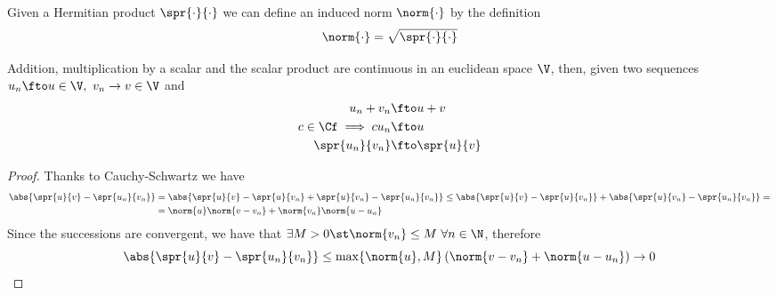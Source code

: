 \documentclass[../mmf.tex]{subfiles}
\begin{document}
\begin{thm}
	Given a Hermitian product $\spr{\cdot}{\cdot}$ we can define an induced norm $\norm{\cdot}$ by the definition
	\begin{equation}
		\norm{\cdot}=\sqrt{\spr{\cdot}{\cdot}}
		\label{eq:indnorm}
	\end{equation}
\end{thm}
\begin{thm}
	Addition, multiplication by a scalar and the scalar product are continuous in an euclidean space $\V$, then, given two sequences $u_n\fto u\in\V,\ v_n\to v\in\V$ and
	\begin{equation*}
		\begin{aligned}
			u_n+v_n&\fto u+v\\
			c\in\Cf\implies cu_n&\fto u\\
			\spr{u_n}{v_n}&\fto\spr{u}{v}
		\end{aligned}
	\end{equation*}
\end{thm}
\begin{proof}
	Thanks to Cauchy-Schwartz we have
	\begin{equation*}
		\begin{aligned}
			\abs{\spr{u}{v}-\spr{u_n}{v_n}}&=\abs{\spr{u}{v}-\spr{u}{v_n}+\spr{u}{v_n}-\spr{u_n}{v_n}}\le\abs{\spr{u}{v}-\spr{u}{v_n}}+\abs{\spr{u}{v_n}-\spr{u_n}{v_n}}=\\
			&=\norm{u}\norm{v-v_n}+\norm{v_n}\norm{u-u_n}
		\end{aligned}
	\end{equation*}
	Since the successions are convergent, we have that $\exists M>0\st\norm{v_n}\le M\ \forall n\in\N$, therefore
	\begin{equation*}
		\abs{\spr{u}{v}-\spr{u_n}{v_n}}\le\max\{\norm{u},M\}\left( \norm{v-v_n}+\norm{u-u_n} \right)\to0
	\end{equation*}
\end{proof}
\end{document}
